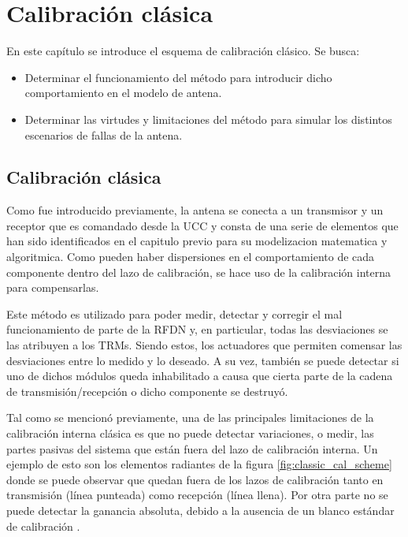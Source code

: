 
\chapter{Calibración clásica}
\label{ch:classicalCalibration}

En este capítulo se introduce el esquema de calibración clásico. Se busca:
\begin{itemize}
	\item Determinar el funcionamiento del método para introducir dicho comportamiento en el modelo de antena. 
	\item Determinar las virtudes y limitaciones del método para simular los distintos escenarios de fallas de la antena.
\end{itemize}


\section{Calibración clásica}

Como fue introducido previamente, la antena se conecta a un transmisor y un receptor que es comandado desde la UCC y consta de
una serie de elementos que han sido identificados en el capitulo previo para su modelizacion matematica y algoritmica. Como 
pueden haber dispersiones en el comportamiento de cada componente dentro del lazo de calibración, se hace uso de la calibración
interna para compensarlas. 

Este método es utilizado para poder medir, detectar y corregir el mal funcionamiento de parte de la RFDN y, en particular, todas
las desviaciones se las atribuyen a los TRMs. Siendo estos, los actuadores que permiten comensar las desviaciones entre lo medido
y lo deseado. A su vez, también se puede detectar si uno de dichos módulos queda inhabilitado a causa que cierta parte de la
cadena de transmisión/recepción o dicho componente se destruyó.

Tal como se mencionó previamente, una de las principales limitaciones de la calibración interna clásica es que no puede
detectar variaciones, o medir, las partes pasivas del sistema que están fuera del lazo de calibración interna. Un ejemplo de
esto son los elementos radiantes de la figura \ref{fig:classic_cal_scheme} donde se puede observar que quedan fuera de los lazos
de calibración tanto en transmisión (línea punteada) como recepción (línea llena). Por otra parte no se puede detectar la
ganancia absoluta, debido a la ausencia de un blanco estándar de calibración \cite{Wang2010}.


